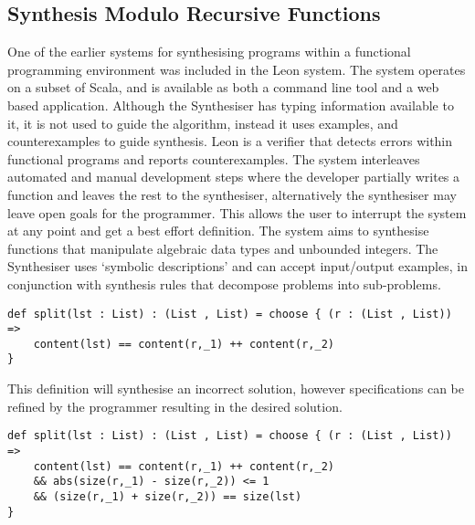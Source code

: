 \documentclass[a4paper]{article}
\begin{document}
\subsection{Synthesis Modulo Recursive Functions}
\label{sec:orge127ff1}
One of the earlier systems for synthesising programs within a functional
programming environment was included in the Leon system. The system 
operates on a subset of Scala, and is available as both a command line
tool and a web based application. Although the Synthesiser has typing 
information available to it, it is not used to guide the algorithm, 
instead it uses examples, and counterexamples to guide synthesis.
Leon is a verifier that detects errors within functional programs and 
reports counterexamples. The system interleaves automated and manual 
development steps where the developer partially writes a function and 
leaves the rest to the synthesiser, alternatively the synthesiser may 
leave open goals for the programmer. This allows the user to interrupt 
the system at any point and get a best effort definition. The system 
aims to synthesise functions that manipulate algebraic data types and 
unbounded integers. The Synthesiser uses `symbolic descriptions' and
can accept input/output examples, in conjunction with synthesis rules
that decompose problems into sub-problems. 

\begin{center}
\begin{verbatim}
def split(lst : List) : (List , List) = choose { (r : (List , List)) => 
	content(lst) == content(r,_1) ++ content(r,_2)
}
\end{verbatim}
\end{center}

This definition will synthesise an incorrect solution, however 
specifications can be refined by the programmer resulting in the 
desired solution.

\begin{center}
\begin{verbatim}
def split(lst : List) : (List , List) = choose { (r : (List , List)) => 
	content(lst) == content(r,_1) ++ content(r,_2)
	&& abs(size(r,_1) - size(r,_2)) <= 1
	&& (size(r,_1) + size(r,_2)) == size(lst)
}
\end{verbatim}
\end{center}
\end{document}
